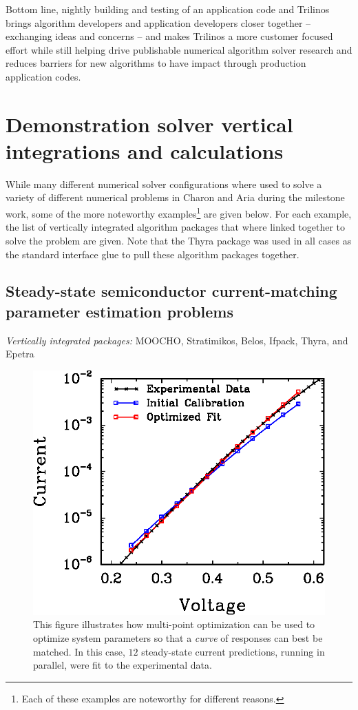 \documentclass[pdf,ps2pdf,11pt]{SANDreport}
\begin{document}
Bottom line, nightly building and testing of an application code and Trilinos
brings algorithm developers and application developers closer together --
exchanging ideas and concerns -- and makes Trilinos a more customer focused
effort while still helping drive publishable numerical algorithm solver
research and reduces barriers for new algorithms to have impact through
production application codes.



%
\section{Demonstration solver vertical integrations and calculations}
\label{sec:demonstration}
%

While many different numerical solver configurations where used to solve a
variety of different numerical problems in Charon and Aria during the
milestone work, some of the more noteworthy examples\footnote{Each of these
examples are noteworthy for different reasons.} are given below.  For each
example, the list of vertically integrated algorithm packages that where
linked together to solve the problem are given.  Note that the Thyra package
was used in all cases as the standard interface glue to pull these algorithm
packages together.

%
\subsection{Steady-state semiconductor current-matching parameter
estimation problems}
%

{}\noindent\textit{Vertically integrated packages:} MOOCHO, Stratimikos,
Belos, Ifpack, Thyra, and Epetra

{\bsinglespace
\begin{figure}
\begin{center}
\includegraphics*[angle=0,scale=0.80,width=0.50\linewidth
]{multiPointFit}
\end{center}
\caption[Multipoint current-matching parameter estimation solution against experimental data]{
\label{fig:multiPointFit}
This figure illustrates how multi-point optimization can be used to optimize
system parameters so that a {\em curve} of responses can best be matched. In
this case, $12$ steady-state current predictions, running in parallel, were
fit to the experimental data.}
\end{figure}
\esinglespace}
\end{document}
